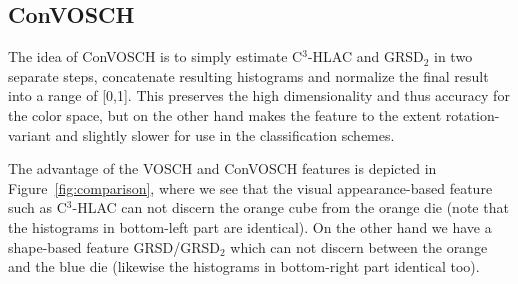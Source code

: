 \documentclass[letterpaper, 10 pt, conference]{sty/ieeeconf}
\begin{document}
\subsection{ConVOSCH}
The idea of ConVOSCH is to simply estimate C$^3$-HLAC and GRSD$_2$ in two separate steps, 
concatenate resulting histograms and normalize the final result into a range of [0,1]. This preserves the 
high dimensionality and thus accuracy for the color space, but on the other hand 
makes the feature to the extent rotation-variant and slightly slower for use 
in the classification schemes.
\vspace{2ex}

The advantage of the VOSCH and ConVOSCH features is depicted in Figure~\ref{fig:comparison},
where we see that the visual appearance-based feature such as C$^3$-HLAC can not
discern the orange cube from the orange die (note that the histograms in bottom-left part are identical). 
On the other hand we have a shape-based feature GRSD/GRSD$_2$
which can not discern between the orange and the blue die (likewise the
histograms in bottom-right part identical too).
\end{document}
